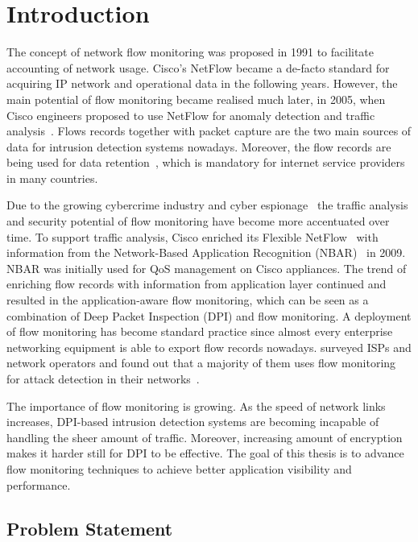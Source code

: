 \chapter{Introduction}

The concept of network flow monitoring was proposed in 1991 to facilitate accounting of network usage. Cisco's NetFlow became a de-facto standard for acquiring IP network and operational data in the following years. However, the main potential of flow monitoring became realised much later, in 2005, when Cisco engineers proposed to use NetFlow for anomaly detection and traffic analysis~\cite{CiscoSystems-2005-Cisco}. Flows records together with packet capture are the two main sources of data for intrusion detection systems nowadays. Moreover, the flow records are being used for data retention~\cite{Wanrooij-2005-Data}, which is mandatory for internet service providers in many countries. 

Due to the growing cybercrime industry and cyber espionage~\cite{CSIS-2013-Economic} the traffic analysis and security potential of flow monitoring have become more accentuated over time. To support traffic analysis, Cisco enriched its Flexible NetFlow~\cite{CiscoSystems-2008-Cisco} with information from the Network-Based Application Recognition (NBAR)~\cite{CiscoSystems--Network} in 2009. NBAR was initially used for QoS management on Cisco appliances. The trend of enriching flow records with information from application layer continued and resulted in the application-aware flow monitoring, which can be seen as a combination of Deep Packet Inspection (DPI) and flow monitoring. A deployment of flow monitoring has become standard practice since almost every enterprise networking equipment is able to export flow records nowadays. \citeauthor{Steinberger-2013-Anomaly} surveyed ISPs and network operators and found out that a majority of them uses flow monitoring for attack detection in their networks~\cite{Steinberger-2013-Anomaly}.

The importance of flow monitoring is growing. As the speed of network links increases, DPI-based intrusion detection systems are becoming incapable of handling the sheer amount of traffic. Moreover, increasing amount of encryption makes it harder still for DPI to be effective. The goal of this thesis is to advance flow monitoring techniques to achieve better application visibility and performance.

\section{Problem Statement}

